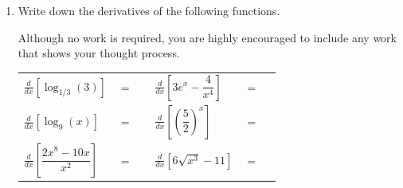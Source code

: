 \documentclass[11pt]{article}
\begin{document}
\begin{enumerate}

\newpage


\item Write down the derivatives of the following functions. 

Although no work is required, you are highly encouraged to include any work that shows your thought process. 

\begin{center}
        \begin{tabular}{l c r l c r}
            $\displaystyle\frac{d}{dx}\left[ \log_{1/3}(3) \right]$ & $=$ & \rule[-8pt]{1.5in}{0.4pt} &
            $\displaystyle\frac{d}{dx}\left[ 3e^x-\dfrac{4}{x^4} \right]$ & $=$ & \rule[-8pt]{1.5in}{0.4pt}\\[1in]
            $\displaystyle\frac{d}{dx}\left[ \log_9(x) \right]$ & $=$ & \rule[-8pt]{1.5in}{0.4pt}&
            $\displaystyle\frac{d}{dx}\left[ \left(\dfrac{5}{2}\right)^x \right]$ & $=$ & \rule[-8pt]{1.5in}{0.4pt}\\[1in]
            $\displaystyle\frac{d}{dx}\left[ \dfrac{2x^8-10x}{x^2} \right]$ & $=$ & \rule[-8pt]{1.5in}{0.4pt} & 
            $\displaystyle\frac{d}{dx}\left[ 6\sqrt{x^3}-11 \right]$ & $=$ & \rule[-8pt]{1.5in}{0.4pt}\\[0.3in]
        \end{tabular}
        
\end{center}


\newpage



\end{enumerate}
\end{document}
